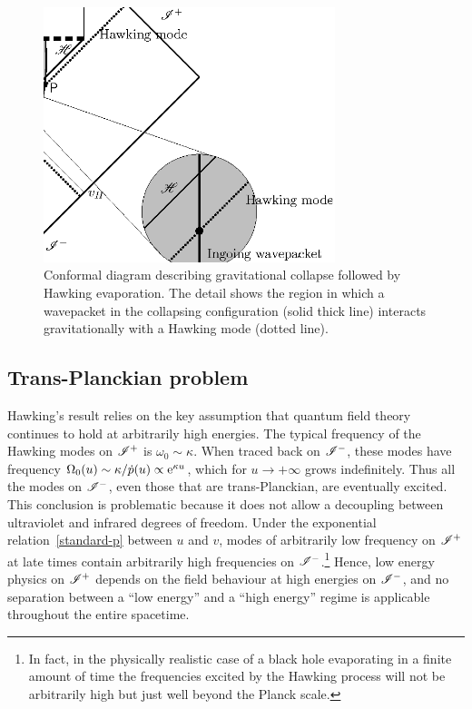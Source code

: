 \documentclass[prd, groupedaddress, showpacs, showkeys, onecolumn, nofootinbib]{revtex4}
\begin{document}
\vskip 1.5cm
%
\begin{figure}[htb]
\begin{center}
\includegraphics[width=8.5cm]{figura.eps}
\end{center}
\caption{Conformal diagram describing gravitational collapse followed by Hawking evaporation.  The detail shows the region in which a wavepacket in the collapsing configuration (solid thick line) interacts gravitationally with a Hawking mode (dotted line).}
\label{figure1}
\end{figure}
%

\subsection{Trans-Planckian problem}
\label{subsec:tP}

Hawking's result relies on the key assumption that quantum field theory continues to hold at arbitrarily high energies.  The typical frequency of the Hawking modes on $\mathscr{I}^+$ is $\omega_0\sim\kappa$.  When traced back on $\mathscr{I}^-$, these modes have frequency $\Omega_0(u)\sim\kappa/\dot{p}(u) \propto {\mathrm e}^{\kappa u}$, which for $u\rightarrow +\infty$ grows indefinitely.  Thus all the modes on $\mathscr{I}^-$, even those that are trans-Planckian, are eventually excited.  This conclusion is problematic because it does not allow a decoupling between ultraviolet and infrared degrees of freedom.  Under the exponential relation~\eqref{standard-p} between $u$ and $v$, modes of arbitrarily low frequency on $\mathscr{I}^+$ at late times contain arbitrarily high frequencies on $\mathscr{I}^-$.\footnote{ In fact, in the physically realistic case of a black hole evaporating in a finite amount of time the frequencies excited by the Hawking process will not be arbitrarily high but  just well beyond the Planck scale.}  Hence, low energy physics on $\mathscr{I}^+$ depends on the field behaviour at high energies on $\mathscr{I}^-$, and no separation between a ``low energy'' and a ``high energy'' regime is applicable throughout the entire  spacetime.  
\end{document}
